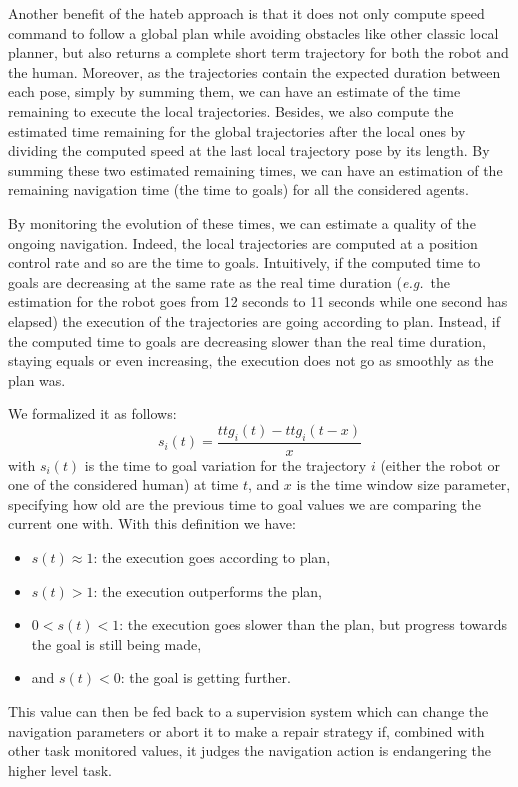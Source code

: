 \documentclass[a4paper,11pt,twoside]{StyleThese}
\begin{document}
Another benefit of the \acrshort{hateb} approach is that it does not only compute speed command to follow a global plan while avoiding obstacles like other classic local planner, but also returns a complete short term trajectory for both the robot and the human. Moreover, as the trajectories contain the expected duration between each pose, simply by summing them, we can have an estimate of the time remaining to execute the local trajectories. Besides, we also compute the estimated time remaining for the global trajectories after the local ones by dividing the computed speed at the last local trajectory pose by its length. By summing these two estimated remaining times, we can have an estimation of the remaining navigation time (the time to goals) for all the considered agents.

By monitoring the evolution of these times, we can estimate a quality of the ongoing navigation. Indeed, the local trajectories are computed at a position control rate and so are the time to goals. Intuitively, if the computed time to goals are decreasing at the same rate as the real time duration (\textit{e.g.}~the estimation for the robot goes from 12 seconds to 11 seconds while one second has elapsed) the execution of the trajectories are going according to plan. Instead, if the computed time to goals are decreasing slower than the real time duration, staying equals or even increasing, the execution does not go as smoothly as the plan was.

We formalized it as follows: 
\begin{equation}
s_i(t) = \frac{ttg_i(t) - ttg_i(t - x)}{x}
\end{equation}
with $s_i(t)$ is the time to goal variation for the trajectory $i$ (either the robot or one of the considered human) at time $t$, and $x$ is the time window size parameter, specifying how old are the previous time to goal values we are comparing the current one with.
With this definition we have:
\begin{itemize}
\item $s(t) \approx 1$: the execution goes according to plan,
\item $s(t) > 1$: the execution outperforms the plan,
\item $0 < s(t) < 1$: the execution goes slower than the plan, but progress towards the goal is still being made,
\item and $s(t) < 0$: the goal is getting further.
\end{itemize}

This value can then be fed back to a supervision system which can change the navigation parameters or abort it to make a repair strategy if, combined with other task monitored values, it judges the navigation action is endangering the higher level task.
\end{document}
